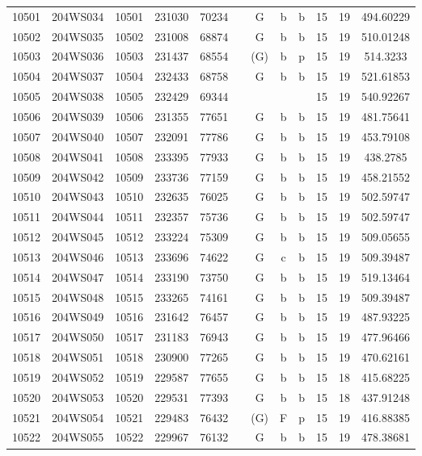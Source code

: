 \begin{tabular}{|*{12}{c|}}
10501 & 204WS034 & 10501 & 231030 & 70234 &  & G & b & b & 15 & 19 & 494.60229 \\ 
10502 & 204WS035 & 10502 & 231008 & 68874 &  & G & b & b & 15 & 19 & 510.01248 \\ 
10503 & 204WS036 & 10503 & 231437 & 68554 &  & (G) & b & p & 15 & 19 & 514.3233 \\ 
10504 & 204WS037 & 10504 & 232433 & 68758 &  & G & b & b & 15 & 19 & 521.61853 \\ 
10505 & 204WS038 & 10505 & 232429 & 69344 &  &  &  &  & 15 & 19 & 540.92267 \\ 
10506 & 204WS039 & 10506 & 231355 & 77651 &  & G & b & b & 15 & 19 & 481.75641 \\ 
10507 & 204WS040 & 10507 & 232091 & 77786 &  & G & b & b & 15 & 19 & 453.79108 \\ 
10508 & 204WS041 & 10508 & 233395 & 77933 &  & G & b & b & 15 & 19 & 438.2785 \\ 
10509 & 204WS042 & 10509 & 233736 & 77159 &  & G & b & b & 15 & 19 & 458.21552 \\ 
10510 & 204WS043 & 10510 & 232635 & 76025 &  & G & b & b & 15 & 19 & 502.59747 \\ 
10511 & 204WS044 & 10511 & 232357 & 75736 &  & G & b & b & 15 & 19 & 502.59747 \\ 
10512 & 204WS045 & 10512 & 233224 & 75309 &  & G & b & b & 15 & 19 & 509.05655 \\ 
10513 & 204WS046 & 10513 & 233696 & 74622 &  & G & c & b & 15 & 19 & 509.39487 \\ 
10514 & 204WS047 & 10514 & 233190 & 73750 &  & G & b & b & 15 & 19 & 519.13464 \\ 
10515 & 204WS048 & 10515 & 233265 & 74161 &  & G & b & b & 15 & 19 & 509.39487 \\ 
10516 & 204WS049 & 10516 & 231642 & 76457 &  & G & b & b & 15 & 19 & 487.93225 \\ 
10517 & 204WS050 & 10517 & 231183 & 76943 &  & G & b & b & 15 & 19 & 477.96466 \\ 
10518 & 204WS051 & 10518 & 230900 & 77265 &  & G & b & b & 15 & 19 & 470.62161 \\ 
10519 & 204WS052 & 10519 & 229587 & 77655 &  & G & b & b & 15 & 18 & 415.68225 \\ 
10520 & 204WS053 & 10520 & 229531 & 77393 &  & G & b & b & 15 & 18 & 437.91248 \\ 
10521 & 204WS054 & 10521 & 229483 & 76432 &  & (G) & F & p & 15 & 19 & 416.88385 \\ 
10522 & 204WS055 & 10522 & 229967 & 76132 &  & G & b & b & 15 & 19 & 478.38681 \\ 

\end{tabular}
